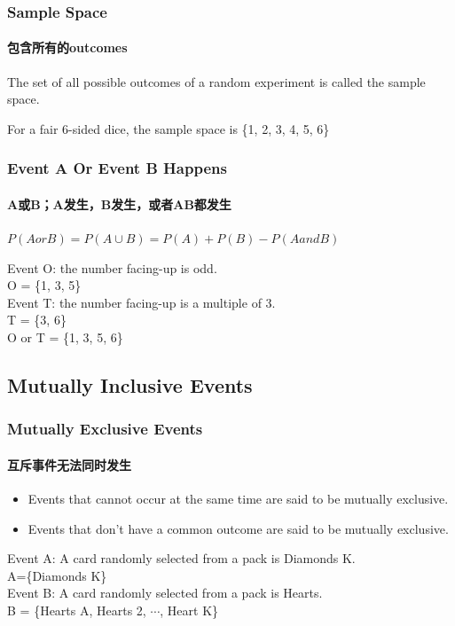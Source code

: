 \documentclass[
	11pt, %
]{beamer}
\begin{document}

\begin{frame}
	\frametitle{Sample Space}
	\framesubtitle{包含所有的outcomes}
	
	\begin{definition}
		The set of
all possible outcomes of a random experiment is called the \alert{sample space}.
	\end{definition}
	\begin{example}
		For a fair 6-sided dice, the sample space is 	 \{1, 2, 3, 4, 5, 6\}\\
	\end{example}
\end{frame}



\begin{frame}
	\frametitle{Event A Or Event B Happens}
	\framesubtitle{A或B；A发生，B发生，或者AB都发生}
	\begin{definition}
	 $P(A or B) = P(A \cup B) = P(A)  + P(B) - P(A and B)$
	\end{definition}

	\begin{example}
		Event O: the number facing-up is odd.\\ O = \{1, 3, 5\}\\
		Event T: the number facing-up is a multiple of 3.\\ T = \{3, 6\}\\
		O or T = \{1, 3, 5, 6\}
	\end{example}
\end{frame}



\subsection{Mutually Inclusive Events}



\begin{frame}
	\frametitle{Mutually Exclusive Events}
	\framesubtitle{互斥事件无法同时发生}
	\begin{definition}
		\begin{itemize}
			\item Events that cannot occur at the same time are said to be mutually
exclusive.
      \item  Events that don't have a common outcome are said to be mutually
exclusive.
		\end{itemize}
	\end{definition}


	\begin{example}
		Event A: A card randomly selected from a pack is Diamonds K.\\
		A=\{Diamonds K\}\\
		Event B: A card randomly selected from a pack is Hearts.\\
		B = \{Hearts A, Hearts 2, $\cdots$, Heart K\}
	\end{example}
\end{frame}
\end{document}
